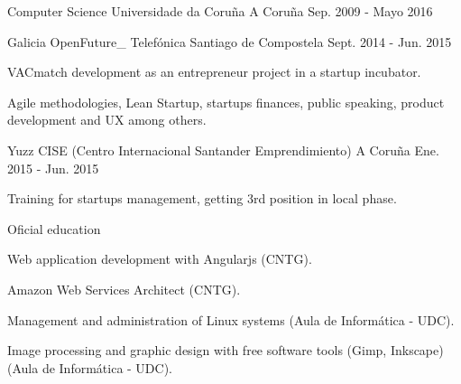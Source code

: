 


\begin{cventries}


\cventry
{Computer Science} %
{Universidade da Coruña} %
{A Coruña} %
{Sep. 2009 - Mayo 2016} %
{ %
\begin{cvitems}
\end{cvitems}
}


\cventry
{Galicia OpenFuture\_} %
{Telefónica} %
{Santiago de Compostela} %
{Sept. 2014 - Jun. 2015} %
{ %
\begin{cvitems}
\item {VACmatch development as an entrepreneur project in a startup 
incubator.}
\item {Agile methodologies, Lean Startup, startups finances, public speaking, 
product development and UX among others.}
\end{cvitems}
}



\cventry
{Yuzz} %
{CISE (Centro Internacional Santander Emprendimiento)} %
{A Coruña} %
{Ene. 2015 - Jun. 2015} %
{ %
\begin{cvitems}
\item {Training for startups management, getting 3rd position in 
local phase.}
\end{cvitems}
}


\cventry
{Oficial education} %
{} %
{} %
{} %
{ %
\begin{cvitems}
\item {Web application development with Angularjs (CNTG).}
\item {Amazon Web Services Architect (CNTG).}
\item {Management and administration of Linux systems (Aula de Informática - 
UDC).}
\item {Image processing and graphic design with free software tools
(Gimp, Inkscape) (Aula de Informática - UDC).}
\end{cvitems}
}


\end{cventries}
